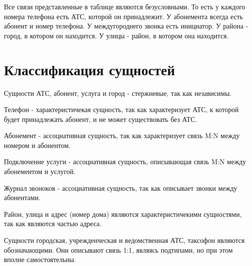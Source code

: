 \documentclass{report}
\begin{document}
Все связи представленные в таблице являются безусловными. То есть у каждого 
номера телефона есть АТС, которой он принадлежит. У абонемента всегда
есть абонент и номер телефона. У междугороднего звонка есть инициатор. 
У района - город, в котором он находится. У улицы - район, в котором она 
находится.

\section{Классификация сущностей}

Сущности АТС, абонент, услуга и город - стержневые, так как независимы. 

Телефон - характеристичекая сущность, 
так как характеризует АТС, к которой будет принадлежать абонент, и не может
существовать без АТС.

Абонемент - ассоциативная сущность, так как характеризует связь M:N между номером и абонентом.

Подключение услуги - ассоциативная сущность, описывающая связь M:N между 
абонементом и услугой.

Журнал звоноков - ассоциативная сущность, так как 
описывает звонки между абонентами.

Район, улица и адрес (номер дома) являются характеристичекими сущностями, 
так как являются частью адреса.

Сущности городская, учрежденческая и ведомственная АТС, таксофон являются
обозначающими. Они описывают связь 1:1, являясь подтипами, но при 
этом вполне самостоятельны. 
\end{document}
